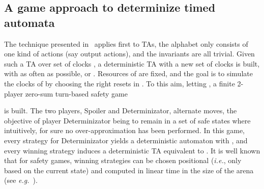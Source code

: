 \documentclass{LMCS}
\theoremstyle{plain}\newtheorem{proposition}[thm]{Proposition}
\begin{document}
\subsection{A game approach to determinize timed automata}
The technique presented
in~\cite{BertrandStainerJeronKrichen-FOSSACS2011} applies first to
TAs, \ie the alphabet only consists of one kind of actions (say output
actions), and the invariants are all trivial. Given such a TA
 over set of clocks , a deterministic TA 
with a new set of clocks  is built, with  as often as possible, or .
Resources of  are fixed, and the goal is to simulate the clocks of  by choosing
the right resets in .  To this aim, letting , a finite
2-player zero-sum turn-based safety game

is built. The two players, Spoiler and Determinizator, alternate moves, the
objective of player Determinizator being to remain in a set of safe
states
where intuitively, for sure no over-approximation has been performed.
In this game, every strategy for Determinizator yields a deterministic
automaton  with , and every
winning strategy induces a deterministic TA  equivalent to
. It is well known that for safety games, winning strategies can be
chosen positional (\emph{i.e.}, only based on the current state) and
computed in linear time in the size of the arena (see
\emph{e.g.}~\cite{mazala-lncs2500}).
\end{document}
